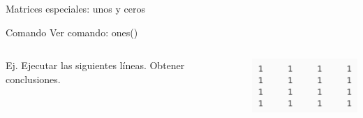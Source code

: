 \documentclass{bredelebeamer}
\begin{document}
\begin{frame}{Matrices especiales: unos y ceros}
\begin{exampleblock}{Comando}
Ver comando: ones()
\end{exampleblock}
\begin{columns}
\begin{column}{0.5\textwidth}
Ej. Ejecutar las siguientes líneas. Obtener conclusiones.

\end{column}
\begin{column}{0.5\textwidth}
\begin{center}
\includegraphics[scale=0.5]{images/pantalla1.png}
\end{center}
\end{column}
\end{columns}
\end{frame}
\end{document}
